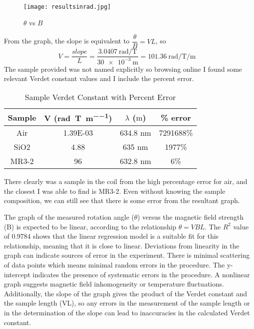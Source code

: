 \documentclass[11pt]{article}
\begin{document}
	\begin{figure}[htbp]
		\centering
		\caption{$\theta$ vs $B$}
		\texttt{[image: resultsinrad.jpg]}
	\end{figure}

	From the graph, the slope is equivalent to $\dfrac{\theta}{B} = VL$, so
	\[
		V = \dfrac{slope}{L} = \dfrac{\qty{3.0407}{\radian\per\tesla}}{\qty{30e-3}{\meter}} = \qty{101.36}{\radian\per\tesla\per\meter}
	\]
	The sample provided was not named explicitly so browsing online I found some relevant Verdet constant values and I include the percent error.

	\begin{table}[htbp]
		\centering
		\caption{Sample Verdet Constant with Percent Error}
		\begin{tabular}{cccc}
			\toprule
			Sample & V (\unit{\radian\per\tesla\per\meter}) & $\lambda$ ($\unit{\meter}$) & \% error \\
			\midrule
			Air & 1.39E-03 & 634.8 nm & 7291688\% \\
			SiO2 & 4.88 & 635 nm & 1977\% \\
			MR3-2 & 96 & 632.8 nm & 6\% \\
			\bottomrule
		\end{tabular}%
		\label{tab:addlabel}%
	\end{table}%

	There clearly was a sample in the coil from the high percentage error for air, and the closest I was able to find is MR3-2. Even without knowing the sample composition, we can still see that there is some error from the resultant graph.

	The graph of the measured rotation angle ($\theta$) versus the magnetic field strength (B) is expected to be linear, according to the relationship $\theta = VBL$. The $R^2$ value of $0.9784$ shows that the linear regression model is a suitable fit for this relationship, meaning that it is close to linear. Deviations from linearity in the graph can indicate sources of error in the experiment. There is minimal scattering of data points which means minimal random errors in the procedure. The y-intercept indicates the presence of systematic errors in the procedure. A nonlinear graph suggests magnetic field inhomogeneity or temperature fluctuations. Additionally, the slope of the graph gives the product of the Verdet constant and the sample length (VL), so any errors in the measurement of the sample length or in the determination of the slope can lead to inaccuracies in the calculated Verdet constant.
\end{document}
